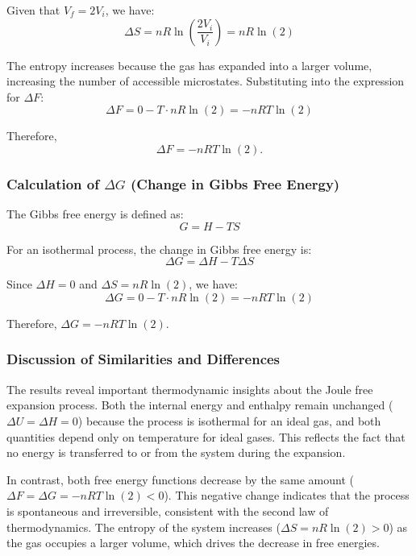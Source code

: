 \documentclass[10pt,twocoloumn]{article}
\begin{document}
Given that $V_f = 2V_i$, we have:
\begin{equation}\Delta S = nR\ln\left(\frac{2V_i}{V_i}\right) = nR\ln(2)\end{equation}

The entropy increases because the gas has expanded into a larger volume, increasing the number of accessible microstates. Substituting into the expression for $\Delta F$:
\begin{equation}\Delta F = 0 - T \cdot nR\ln(2) = -nRT\ln(2)\end{equation}

Therefore,
\begin{equation}\boxed{\Delta F = -nRT\ln(2)}.\end{equation}

\subsubsection*{Calculation of $\Delta G$ (Change in Gibbs Free Energy)}

The Gibbs free energy is defined as:
\begin{equation}G = H - TS\end{equation}

For an isothermal process, the change in Gibbs free energy is:
\begin{equation}\Delta G = \Delta H - T\Delta S\end{equation}

Since $\Delta H = 0$ and $\Delta S = nR\ln(2)$, we have:
\begin{equation}\Delta G = 0 - T \cdot nR\ln(2) = -nRT\ln(2)\end{equation}

Therefore, $\boxed{\Delta G = -nRT\ln(2)}$.

\subsubsection*{Discussion of Similarities and Differences}

The results reveal important thermodynamic insights about the Joule free expansion process. Both the internal energy and enthalpy remain unchanged ($\Delta U = \Delta H = 0$) because the process is isothermal for an ideal gas, and both quantities depend only on temperature for ideal gases. This reflects the fact that no energy is transferred to or from the system during the expansion.

In contrast, both free energy functions decrease by the same amount ($\Delta F = \Delta G = -nRT\ln(2) < 0$). This negative change indicates that the process is spontaneous and irreversible, consistent with the second law of thermodynamics. The entropy of the system increases ($\Delta S = nR\ln(2) > 0$) as the gas occupies a larger volume, which drives the decrease in free energies.
\end{document}
